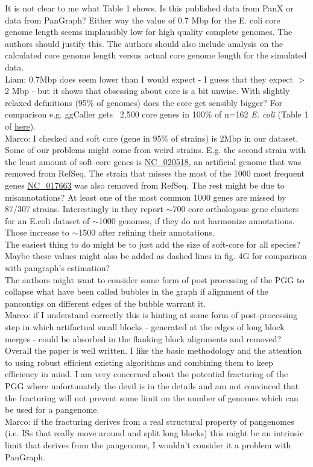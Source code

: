 \documentclass[aps,rmp,onecolumn]{revtex4-1}
\newcommand{\Marco}[1]{{\color{gray}Marco: #1}}
\newcommand{\Liam}[1]{{\color{teal}Liam: #1}}
\begin{document}
It is not clear to me what Table 1 shows. Is this published data from PanX or data from PanGraph? Either way the value of 0.7 Mbp for the E. coli core genome length seems implausibly low for high quality complete genomes. The authors should justify this. The authors should also include analysis on the calculated core genome length versus actual core genome length for the simulated data.\\
\Liam{0.7Mbp does seem lower than I would expect - I guess that they expect $>$2 Mbp - but it shows that obsessing about core is a bit unwise. With slightly relaxed definitions (95\% of genomes) does the core get sensibly bigger? For comparison e.g. ggCaller gets ~2,500 core genes in 100\% of n=162 \textit{E. coli} (Table 1 of \href{https://www.biorxiv.org/content/10.1101/2023.01.24.524926v1.full.pdf}{here}).}\\
\Marco{I checked and soft core (gene in 95\% of strains) is 2Mbp in our dataset. Some of our problems might come from weird strains. E.g. the second strain with the least amount of soft-core genes is \href{https://www.ncbi.nlm.nih.gov/nuccore/NC_020518.1?report=genbank}{NC\_020518}, an artificial genome that was removed from RefSeq. The strain that misses the most of the 1000 most frequent genes \href{https://www.ncbi.nlm.nih.gov/nuccore/NC_017663.1?report=genbank}{NC\_017663} was also removed from RefSeq. The rest might be due to misannotations? At least one of the most common 1000 genes are missed by 87/307 strains. Interestingly in \cite{sutton2021pan} they report $\sim$700 core orthologous gene clusters for an E.coli dataset of $\sim$1000 genomes, if they do not harmonize annotations. Those increase to $\sim$1500 after refining their annotations.\\
The easiest thing to do might be to just add the size of soft-core for all species? Maybe these values might also be added as dashed lines in fig. 4G for comparison with pangraph's estimation?}\\
The authors might want to consider some form of post processing of the PGG to collapse what have been called bubbles in the graph if alignment of the pancontigs on different edges of the bubble warrant it.\\
\Marco{if I understand correctly this is hinting at some form of post-processing step in which artifactual small blocks - generated at the edges of long block merges - could be absorbed in the flanking block alignments and removed?}\\

Overall the paper is well written. I like the basic methodology and the attention to using robust efficient existing algorithms and combining them to keep efficiency in mind. I am very concerned about the potential fracturing of the PGG where unfortunately the devil is in the details and am not convinced that the fracturing will not prevent some limit on the number of genomes which can be used for a pangenome.\\
\Marco{if the fracturing derives from a real structural property of pangenomes (i.e. ISs that really move around and split long blocks) this might be an intrinsic limit that derives from the pangenome, I wouldn't consider it a problem with PanGraph.}\\
\end{document}
